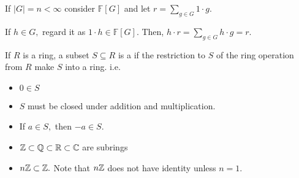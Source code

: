 \documentclass[a4paper]{article}
\begin{document}
\begin{example}
    If $|G|=n<\infty$ consider $\mathbb F[G]$ and let $r=\sum_{g\in G}1\cdot g.$

    If $h\in G,$ regard it as $1\cdot h\in\mathbb F[G].$ Then, $h\cdot r=\sum_{g\in G}h\cdot g=r.$
\end{example}
\begin{definition}[Subring]
    If $R$ is a ring, a subset $S\subseteq R$ is a  if the restriction to $S$ of the ring operation from $R$ make $S$ into a ring. i.e.
    \begin{itemize}
        \item $0\in S$
        \item $S$ must be closed under addition and multiplication.
        \item If $a\in S,$ then $-a\in S.$
    \end{itemize}
\end{definition}
\begin{itemize}
    \item $\mathbb{Z}\subset\mathbb{Q}\subset\mathbb{R}\subset\mathbb{C}$ are subrings
    \item $n\mathbb{Z}\subset\mathbb{Z}.$ Note that $n\mathbb{Z}$ does not have identity unless $n=1.$
\end{itemize}
\end{document}
